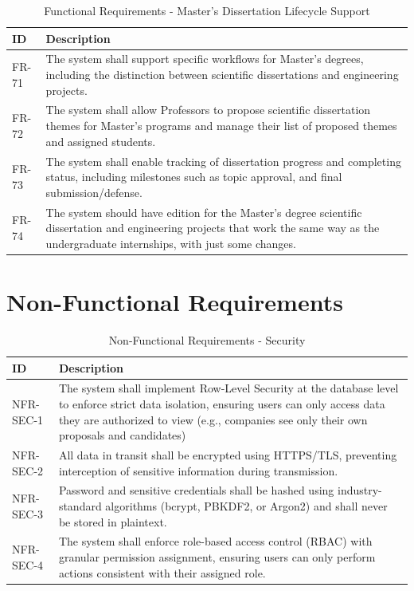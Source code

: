 {
    \begin{table}[H]
        \centering
        \caption{Functional Requirements - Master's Dissertation Lifecycle Support}
        \label{tab:freq-masters} 
        \begin{tabular}{|l|p{12cm}|} %
            \hline
            \textbf{ID} & \textbf{Description} \\ \hline
            FR-71 & The system shall support specific workflows for Master's degrees, including the distinction between scientific dissertations and engineering projects. \\ \hline
            FR-72 & The system shall allow Professors to propose scientific dissertation themes for Master's programs and manage their list of proposed themes and assigned students. \\ \hline
            FR-73 & The system shall enable tracking of dissertation progress and completing status, including milestones such as topic approval, and final submission/defense. \\ \hline
            FR-74 & The system should have edition for the Master's degree scientific dissertation and engineering projects that work the same way as the undergraduate internships, with just some changes. \\ \hline
        \end{tabular}
    \end{table}    
}

\newpage
\section*{Non-Functional Requirements}

{
    \begin{table}[H]
        \centering
        \caption{Non-Functional Requirements - Security}
        \label{tab:nfreq-security} 
        \begin{tabular}{|l|p{11cm}|} %
            \hline
            \textbf{ID} & \textbf{Description} \\ \hline
            NFR-SEC-1 & The system shall implement Row-Level Security at the database level to enforce strict data isolation, ensuring users can only access data they are authorized to view (e.g., companies see only  their own proposals and candidates) \\ \hline
            NFR-SEC-2 & All data in transit shall be encrypted using HTTPS/TLS, preventing interception of sensitive information during transmission. \\ \hline
            NFR-SEC-3 & Password and sensitive credentials shall be hashed using industry-standard algorithms (bcrypt, PBKDF2, or Argon2) and shall never be stored in plaintext. \\ \hline
            NFR-SEC-4 & The system shall enforce role-based access control (RBAC) with granular permission assignment, ensuring users can only perform actions consistent with their assigned role. \\ \hline
        \end{tabular}
    \end{table}    
}


